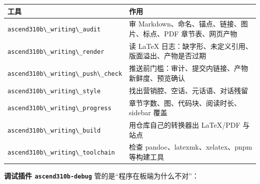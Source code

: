 \begin{longtable}[]{@{}
  >{\raggedright\arraybackslash}p{}
  >{\raggedright\arraybackslash}p{}@{}}
\toprule\noalign{}
\begin{minipage}[b]{\linewidth}\raggedright
工具
\end{minipage} & \begin{minipage}[b]{\linewidth}\raggedright
作用
\end{minipage} \\
\midrule\noalign{}
\endhead
\bottomrule\noalign{}
\endlastfoot
\passthrough{\lstinline!ascend310b\_writing\_audit!} & 审
Markdown、命名、锚点、链接、图片、标点、PDF 章节表、网页产物 \\
\passthrough{\lstinline!ascend310b\_writing\_render!} & 读 LaTeX
日志：缺字形、未定义引用、版面溢出、产物是否过期 \\
\passthrough{\lstinline!ascend310b\_writing\_push\_check!} &
推送前门槛：审计、提交内链接、产物新鲜度、预览确认 \\
\passthrough{\lstinline!ascend310b\_writing\_style!} &
找出营销腔、空话、元话语、对话残留 \\
\passthrough{\lstinline!ascend310b\_writing\_progress!} &
章节字数、图、代码块、阅读时长、sidebar 覆盖 \\
\passthrough{\lstinline!ascend310b\_writing\_build!} &
用仓库自己的转换器出 LaTeX/PDF 与站点 \\
\passthrough{\lstinline!ascend310b\_writing\_toolchain!} & 检查
pandoc、latexmk、xelatex、pnpm 等构建工具 \\
\end{longtable}

\textbf{调试插件 \passthrough{\lstinline!ascend310b-debug!}}
管的是``程序在板端为什么不对''：

